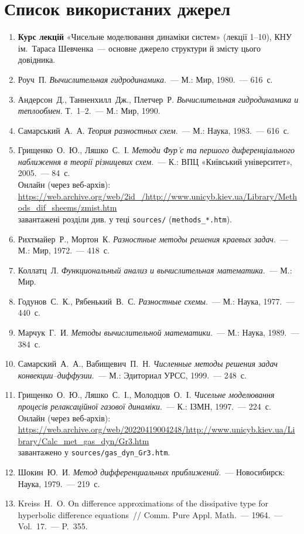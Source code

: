\documentclass[12pt,a4paper]{article}
\theoremstyle{definition}
\theoremstyle{plain}
\begin{document}
\section*{Список використаних джерел}
\begin{enumerate}[leftmargin=1.8em]
  \item \textbf{Курс лекцій} «Чисельне моделювання динаміки систем»
  (лекції 1--10), КНУ ім.~Тараса Шевченка~--- основне джерело структури
  й змісту цього довідника.
  \item Роуч~П. \emph{Вычислительная гидродинамика}.~--- М.: Мир, 1980.~--- 616~с.
  \item Андерсон~Д., Танненхилл~Дж., Плетчер~Р. \emph{Вычислительная
  гидродинамика и теплообмен}. Т.~1--2.~--- М.: Мир, 1990.
  \item Самарський~А.~А. \emph{Теория разностных схем}.~--- М.: Наука, 1983.~--- 616~с.
  \item Грищенко~О.~Ю., Ляшко~С.~І. \emph{Методи Фур'є та першого
  диференціального наближення в теорії різницевих схем}.~--- К.: ВПЦ
  «Київський університет», 2005.~--- 84~с.\\
  {\small Онлайн (через веб-архів):
  \url{https://web.archive.org/web/2id_/http://www.unicyb.kiev.ua/Library/Methods_dif_sheems/zmist.htm}\\
  завантажені розділи див. у теці \texttt{sources/} (\texttt{methods\_*.htm}).}
  \item Рихтмайер~Р., Мортон~К. \emph{Разностные методы решения краевых
  задач}.~--- М.: Мир, 1972.~--- 418~с.
  \item Коллатц~Л. \emph{Функциональный анализ и вычислительная математика}.~--- М.: Мир.
  \item Годунов~С.~К., Рябенький~В.~С. \emph{Разностные схемы}.~--- М.: Наука, 1977.~--- 440~с.
  \item Марчук~Г.~И. \emph{Методы вычислительной математики}.~--- М.: Наука, 1989.~--- 384~с.
  \item Самарский~А.~А., Вабищевич~П.~Н. \emph{Численные методы решения
  задач конвекции--диффузии}.~--- М.: Эдиториал УРСС, 1999.~--- 248~с.
  \item Грищенко~О.~Ю., Ляшко~С.~І., Молодцов~О.~І. \emph{Чисельне
  моделювання процесів релаксаційної газової динаміки}.~--- К.: ІЗМН, 1997.~--- 224~с.\\
  {\small Онлайн (через веб-архів):
  \url{https://web.archive.org/web/20220419004248/http://www.unicyb.kiev.ua/Library/Calc_met_gas_dyn/Gr3.htm}\\
  завантажено у \texttt{sources/gas\_dyn\_Gr3.htm}.}
  \item Шокин~Ю.~И. \emph{Метод дифференциальных приближений}.~--- Новосибирск: Наука, 1979.~--- 219~с.
  \item Kreiss~H.~O. On difference approximations of the dissipative type
  for hyperbolic difference equations~// Comm. Pure Appl. Math.~--- 1964.~--- Vol.~17.~--- P.~355.
\end{enumerate}
\end{document}
